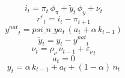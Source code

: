\documentclass[10pt,a4paper]{article}
\begin{document}
\begin{dmath}
{i}_{t}={\pi}_{t}\, {\phi_{\pi}}+{\tilde y}_{t}\, {\phi_{y}}+{\nu}_{t}
\end{dmath}
\begin{dmath}
{r^r}_{t}={i}_{t}-{\pi}_{t+1}
\end{dmath}
\begin{dmath}
{y^{nat}}_{t}=psi\_n\_ya_{t}\, \left({a}_{t}+{\alpha}\, {k}_{t-1}\right)
\end{dmath}
\begin{dmath}
{\tilde y}_{t}={y}_{t}-{y^{nat}}_{t}
\end{dmath}
\begin{dmath}
{\nu}_{t}={\rho_{\nu}}\, {\nu}_{t-1}+{\varepsilon_\nu}_{t}
\end{dmath}
\begin{dmath}
{a}_{t}=0
\end{dmath}
\begin{dmath}
{y}_{t}={\alpha}\, {k}_{t-1}+{a}_{t}+\left(1-{\alpha}\right)\, {n}_{t}
\end{dmath}
\end{document}
